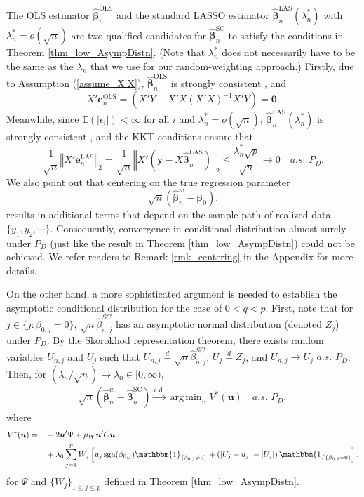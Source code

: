\documentclass[ejs,authoryear,linksfromyear]{imsart}
\DeclareMathOperator*{\argmin}{arg\,min} %
\newcommand{\CONV}[1]{\stackrel{\text{#1}}{\longrightarrow}} %
\newcommand{\bnw}{\widehat{\bm{\beta}}_n^w} %
\newcommand{\bSC}{\widehat{\bm{\beta}}_n^{\text{SC}}} %
\newcommand{\bLS}{\widehat{\bm{\beta}}_n^{\text{OLS}}} %
\newcommand{\bLAS}{\widehat{\bm{\beta}}_n^{\text{LAS}}} %
\newcommand{\eLS}{\bm{e}_n^{\text{OLS}}} %
\newcommand{\eLAS}{\bm{e}_n^{\text{LAS}}} %
\numberwithin{equation}{section}
\theoremstyle{plain}
\begin{document}
The OLS estimator $\bLS$ and the standard LASSO estimator $\bLAS (\lambda_n^*)$ with $\lambda_n^* = o(\sqrt{n})$ are two qualified candidates for $\bSC$ to satisfy the conditions in Theorem \ref{thm_low_AsympDistn}. (Note that $\lambda_n^*$ does not necessarily have to be the same as the $\lambda_n$ that we use for our random-weighting approach.) Firstly, due to Assumption (\ref{assume_X'X}), $\bLS$ is strongly consistent \citep{LSEstrong}, and
$$
X' \eLS 
= \left( X'Y - X'X (X'X)^{-1} X'Y \right)
= \bm{0}.
$$ 
Meanwhile, since $\mathbb{E}(|\epsilon_i|) < \infty$ for all $i$ and $\lambda_n^* = o(\sqrt{n})$, $\bLAS (\lambda_n^*)$ is strongly consistent \citep{Chatterjee&Lahiri}, and the KKT conditions ensure that
$$
\dfrac{1}{\sqrt{n}} \left\Vert X' \eLAS \right\Vert_2
=  \dfrac{1}{\sqrt{n}} \left\Vert X' \left( \bm{y} - X \bLAS \right)  \right\Vert_2
\leq \dfrac{\lambda_n^* \sqrt{p}}{\sqrt{n}} 
\to 0 \quad a.s. \,\, P_D. 
$$  
We also point out that centering on the true regression parameter 
$$
\sqrt{n} \left( \bnw - \bm{\beta}_0 \right). 
$$ 
results in additional terms that depend on the sample path of realized data $\{y_1, y_2, \cdots\}$. Consequently, convergence in conditional distribution almost surely under $P_D$ (just like the result in Theorem \ref{thm_low_AsympDistn}) could not be achieved. We refer readers to Remark \ref{rmk_centering} in the Appendix for more details.

On the other hand, a more sophisticated argument is needed to establish the asymptotic conditional distribution for the case of $0< q < p$. First, note that for $j \in \{j: \beta_{0,j} = 0 \}$, $\sqrt{n} \widehat{\beta}_{n,j}^{SC}$ has an asymptotic normal distribution (denoted $Z_j$) under $P_D$. By the Skorokhod representation theorem, there exists random variables $U_{n,j}$ and $U_j$ such that $U_{n,j} \stackrel{d}{=} \sqrt{n} \widehat{\beta}_{n,j}^{SC}$, $U_j \stackrel{d}{=} Z_j$, and $U_{n,j} \to U_j \,\, a.s. \,\, P_D$. Then, for $(\lambda_n / \sqrt{n}) \to \lambda_0 \in [0,\infty)$,
\begin{align} \label{eq.SkorokhodResult}
\sqrt{n} \left( \bnw - \bSC \right) 
\CONV{c.d.}
\argmin_{\bm{u}} V^* (\bm{u})
\quad a.s. \,\, P_D,
\end{align}
\noindent where
\begin{alignat*}{2}
V^*(\bm{u}) 
&= &&-2 \bm{u}' \Psi + \mu_W \bm{u}' C \bm{u} \\
&	&&+ \lambda_0 \sum_{j=1}^p W_j
\left[
u_j \, \text{sgn}(\beta_{0,j}) 
\mathbbm{1}_{ \{ \beta_{0,j} \neq 0 \}}
+ \left( | U_j + u_j | - | U_j | \right) 
\mathbbm{1}_{ \{ \beta_{0,j} = 0 \}} 
\right],
\end{alignat*}
for $\Psi$ and $\{W_j\}_{1 \leq j \leq p}$ defined in Theorem \ref{thm_low_AsympDistn}. 
\end{document}
